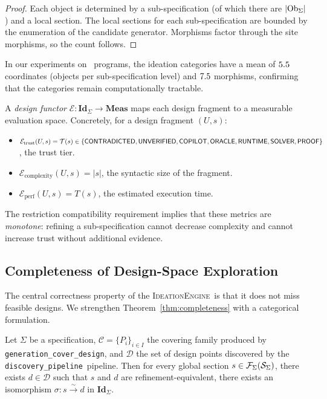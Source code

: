 \documentclass[11pt]{article}
\newcommand{\IdeationEngine}{\textsc{IdeationEngine}}
\newcommand{\DiscPipe}{\texttt{discovery\_pipeline}}
\newcommand{\GenCover}{\texttt{generation\_cover\_design}}
\begin{document}
\begin{proof}
Each object is determined by a sub-specification (of which there are
$|\mathrm{Ob}_\Sigma|$) and a local section.  The local sections for each
sub-specification are bounded by the enumeration of the candidate
generator.  Morphisms factor through the site morphisms, so the count
follows.
\end{proof}

In our experiments on \ppLIItotalPrograms\ programs, the ideation
categories have a mean of $5.5$ coordinates (objects per
sub-specification level) and $7.5$ morphisms, confirming
that the categories remain computationally tractable.

\begin{definition}\label{def:design-functor}
A \emph{design functor} $\mathcal{E}\colon \mathbf{Id}_\Sigma \to
\mathbf{Meas}$ maps each design fragment to a measurable evaluation
space.  Concretely, for a design fragment $(U, s)$:
\begin{itemize}[noitemsep]
  \item $\mathcal{E}_{\text{trust}}(U, s) = \mathcal{T}(s) \in
        \{\mathsf{CONTRADICTED}, \mathsf{UNVERIFIED}, \mathsf{COPILOT}, \mathsf{ORACLE}, \mathsf{RUNTIME},
         \mathsf{SOLVER}, \mathsf{PROOF}\}$, the trust tier.
  \item $\mathcal{E}_{\text{complexity}}(U, s) = |s|$, the syntactic
        size of the fragment.
  \item $\mathcal{E}_{\text{perf}}(U, s) = T(s)$, the estimated
        execution time.
\end{itemize}
The restriction compatibility requirement implies that these metrics are
\emph{monotone}: refining a sub-specification cannot decrease complexity
and cannot increase trust without additional evidence.
\end{definition}

\subsection{Completeness of Design-Space Exploration}

The central correctness property of the \IdeationEngine\ is that it
does not miss feasible designs.  We strengthen
Theorem~\ref{thm:completeness} with a categorical formulation.

\begin{theorem}\label{thm:cat-completeness}
Let $\Sigma$ be a specification, $\mathcal{C} = \{P_i\}_{i \in I}$ the
covering family produced by \GenCover, and $\mathcal{D}$ the set of
design points discovered by the \DiscPipe\ pipeline.  Then for every
global section $s \in \mathcal{F}_\Sigma(\mathcal{S}_\Sigma)$, there exists
$d \in \mathcal{D}$ such that $s$ and $d$ are refinement-equivalent,
\ie there exists an isomorphism $\sigma\colon s \xrightarrow{\sim} d$
in $\mathbf{Id}_\Sigma$.
\end{theorem}
\end{document}
